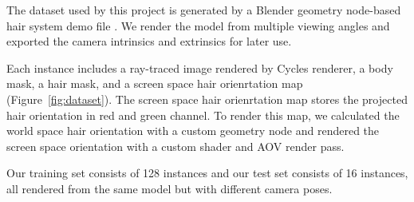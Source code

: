 \documentclass{article}
\begin{document}

The dataset used by this project is generated by a Blender geometry node-based hair system demo file \cite{foundation_blender_nodate}. We render the model from multiple viewing angles and exported the camera intrinsics and extrinsics for later use.

Each instance includes a ray-traced image rendered by Cycles renderer, a body mask, a hair mask, and a screen space hair orienrtation map (Figure~\ref{fig:dataset}). The screen space hair orienrtation map stores the projected hair orientation in red and green channel. To render this map, we calculated the world space hair orientation with a custom geometry node and rendered the screen space orientation with a custom shader and AOV render pass.

Our training set consists of 128 instances and our test set consists of 16 instances, all rendered from the same model but with different camera poses.
\end{document}
